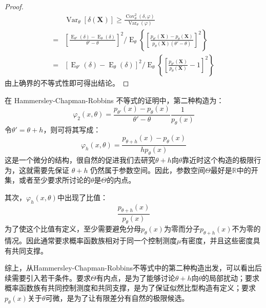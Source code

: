 \begin{proof}
\begin{align*}
		&\operatorname{Var}_{\theta}[\delta(\mathbf{X})]\geqslant\frac{\operatorname{Cov}_{\theta}^2(\delta,\varphi)}{\operatorname{Var}_{\theta}(\varphi)} \\
		=&\left[\frac{\operatorname{E}_{\theta'}(\delta)-\operatorname{E}_{\theta}(\delta)}{\theta'-\theta}\right]^2\Big/\operatorname{E}_{\theta}\left\{\left[\frac{p_{\theta'}(\mathbf{X})-p_{\theta}(\mathbf{X})}{p_{\theta}(\mathbf{X})(\theta'-\theta)}\right]^2\right\} \\
		=&[\operatorname{E}_{\theta'}(\delta)-\operatorname{E}_{\theta}(\delta)]^2\Big/\operatorname{E}_{\theta}\left\{\left[\frac{p_{\theta'}(\mathbf{X})}{p_{\theta}(\mathbf{X})}-1\right]^2\right\}
	\end{align*}
	由上确界的不等式性即可得出结论。
\end{proof}
\begin{note}
	在 Hammersley-Chapman-Robbins 不等式的证明中，第二种构造为：
	\begin{equation*}
		\varphi_2(x,\theta)=\frac{p_{\theta'}(x)-p_\theta(x)}{\theta'-\theta}\frac{1}{p_\theta(x)}
	\end{equation*}
	令$\theta'=\theta+h$，则可将其写成：
	\begin{equation*}
		\varphi_h(x,\theta)=\frac{p_{\theta+h}(x)-p_\theta(x)} {hp_\theta(x)}
	\end{equation*}
	这是一个微分的结构，很自然的促进我们去研究$\theta+h$向$\theta$靠近时这个构造的极限行为，这就需要先保证 $\theta+h$ 仍然属于参数空间。因此，参数空间$\Theta$最好是$\mathbb{R}$中的开集，或者至少要求所讨论的$\theta$是$\Theta$的内点。\par
	其次，$\varphi_h(x,\theta)$中出现了比值：
	\begin{equation*}
		\frac{p_{\theta+h}(x)}{p_\theta(x)}
	\end{equation*}
	为了使这个比值有定义，至少需要避免分母$p_\theta(x)$为零而分子$p_{\theta+h}(x)$不为零的情况。因此通常要求概率函数族相对于同一个控制测度$\mu$有密度，并且这些密度具有共同支撑。\par
	综上，从Hammersley-Chapman-Robbins不等式中的第二种构造出发，可以看出后续需要引入若干条件。要求$\Theta$有内点，是为了能够讨论$\theta+h$向$\theta$的局部扰动；要求概率函数族有共同控制测度和共同支撑，是为了保证似然比型构造有定义；要求$p_\theta(x)$关于$\theta$可微，是为了让有限差分有自然的极限候选。 
\end{note}
